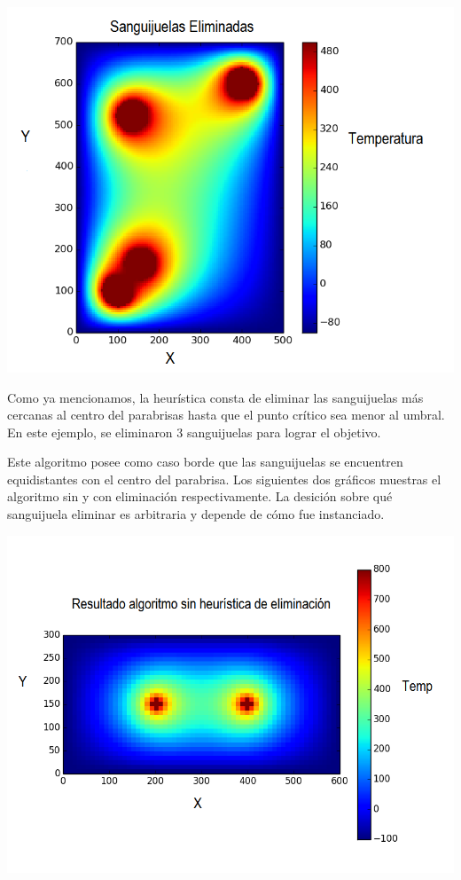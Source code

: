 	\begin{center}
		\includegraphics[scale=0.5]{./img/test5_conkill.png}
	\end{center}

	Como ya mencionamos, la heurística consta de eliminar las sanguijuelas más cercanas al centro del parabrisas hasta que el punto crítico sea menor al umbral. En este ejemplo, se eliminaron 3 sanguijuelas para lograr el objetivo.

	Este algoritmo posee como caso borde que las sanguijuelas se encuentren equidistantes con el centro del parabrisa. Los siguientes dos gráficos muestras el algoritmo sin y con eliminación respectivamente. La desición sobre qué sanguijuela eliminar es arbitraria y depende de cómo fue instanciado.

	\begin{center}
		\includegraphics[scale=0.5]{./img/test6_sinkill.png}
	\end{center}

